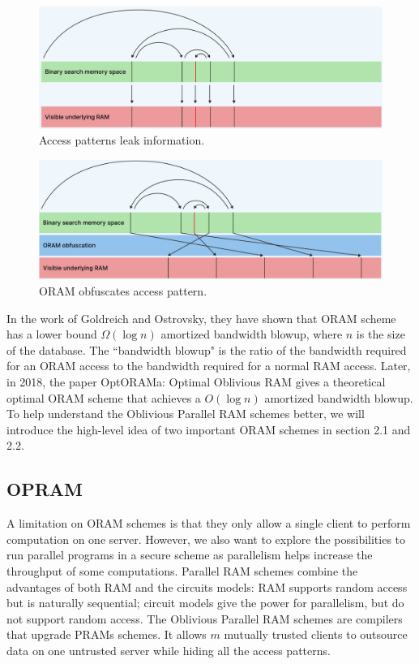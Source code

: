 \documentclass[fontsize=11pt]{article}
\begin{document}
\begin{figure}
    \centering
    \includegraphics[width=0.5\linewidth]{pics/access_pattern.png}
    \caption{Access patterns leak information.}
    \label{fig:access_pattern}
\end{figure}
\begin{figure}
    \centering
    \includegraphics[width=0.5\linewidth]{pics/obfuscated.png}
    \caption{ORAM obfuscates access pattern.}
    \label{fig:obfuscated}
\end{figure}






In the work of Goldreich and Ostrovsky, they have shown that ORAM scheme has a lower bound $\Omega(\log n)$ amortized bandwidth blowup, where $n$ is the size of the database. The ``bandwidth blowup" is the ratio of the bandwidth required for an ORAM access to the bandwidth required for a normal RAM access. Later, in 2018, the paper OptORAMa: Optimal Oblivious RAM \cite{OptORAMa18} gives a theoretical optimal ORAM scheme that achieves a $O(\log n)$ amortized bandwidth blowup. 
 To help understand the Oblivious Parallel RAM schemes better, we will introduce the high-level idea of two important ORAM schemes in section 2.1 and 2.2.


\subsection{OPRAM}
A limitation on ORAM schemes is that they only allow a single client to perform computation on one server. However, we also want to explore the possibilities to run parallel programs in a secure scheme as parallelism helps increase the throughput of some computations. Parallel RAM schemes combine the advantages of both RAM and the circuits models: RAM supports random access but is naturally sequential; circuit models give the power for parallelism, but do not support random access. The Oblivious Parallel RAM schemes are compilers that upgrade PRAMs schemes. It allows $m$ mutually trusted clients to outsource data on one untrusted server while hiding all the access patterns. 
\end{document}
